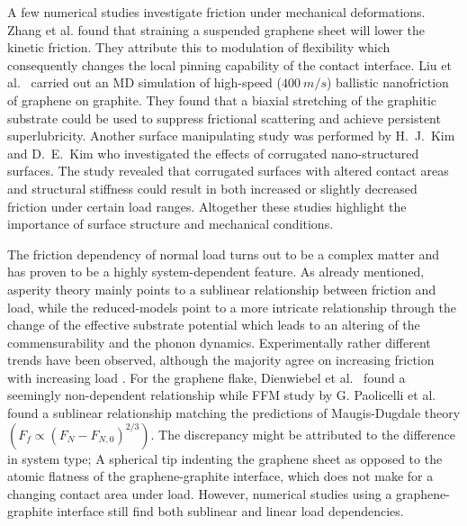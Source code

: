 


A few numerical studies investigate friction under mechanical deformations. 
Zhang et al. \cite{zhang_tuning_2019} found that straining a suspended graphene sheet will lower the kinetic friction. They attribute this to modulation of flexibility which consequently changes the local pinning capability of the contact interface. Liu et al.\ \cite{liu_high-speed_2014} carried out an \acrshort{MD} simulation of high-speed ($\SI{400}{m/s}$) ballistic nanofriction of graphene on graphite. They found that a biaxial stretching of the graphitic substrate could be used to suppress frictional scattering and achieve persistent superlubricity. Another surface manipulating study was performed by H.\ J.\ Kim and D.\ E.\ Kim \cite{Kim_2012} who investigated the effects of corrugated
nano-structured surfaces. The study revealed that corrugated surfaces with altered contact areas and structural stiffness could result in both increased or slightly decreased friction under certain load ranges. Altogether these studies highlight the importance of surface structure and mechanical conditions. 


The friction dependency of normal load turns out to be a complex matter and has
proven to be a highly system-dependent feature. As already mentioned, asperity
theory mainly points to a sublinear relationship between friction and load,
while the reduced-models point to a more intricate relationship through
the change of the effective substrate potential which leads to an altering of
the commensurability and the phonon dynamics. Experimentally rather different trends have been observed, although the majority agree on increasing friction with
increasing load \cite[p. 200]{gnecco_meyer_2015}. For the graphene flake,
Dienwiebel et al.\ \cite{DIENWIEBEL2005197} found a seemingly non-dependent
relationship while \acrshort{FFM} study by G. Paolicelli et al.\
\cite{Paolicelli_2015} found a sublinear relationship matching the predictions of
Maugis-Dugdale theory $(F_f \propto (F_N - F_{N,0})^{2/3})$. The discrepancy
might be attributed to the difference in system type; A spherical tip indenting the graphene sheet as opposed to the atomic flatness of the graphene-graphite
interface, which does not make for a changing contact area under load. However,
numerical studies using a graphene-graphite interface still find both sublinear
\cite{bonelli_atomistic_2009} and linear \cite{ma12091425, zhang_tuning_2019}
load dependencies. 

